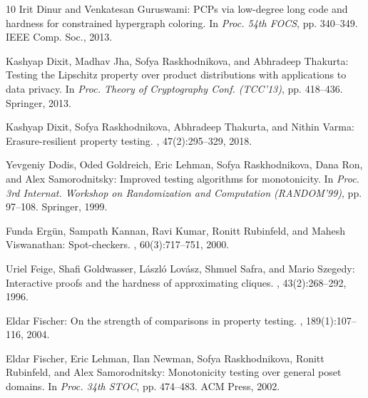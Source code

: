 \documentclass[11pt]{article}
\numberwithin{equation}{section}
\theoremstyle{definition}
\theoremstyle{plain}
\begin{document}
\begin{thebibliography}{10}
{\sc Irit Dinur and Venkatesan Guruswami}: {PCP}s via low-degree long code and
  hardness for constrained hypergraph coloring.
\newblock In {\em Proc. 54th FOCS}, pp. 340--349. IEEE Comp. Soc., 2013.

{\sc Kashyap Dixit, Madhav Jha, Sofya Raskhodnikova, and Abhradeep Thakurta}:
  Testing the {Lipschitz} property over product distributions with applications
  to data privacy.
\newblock In {\em Proc. Theory of Cryptography Conf. (TCC'13)}, pp. 418--436.
  Springer, 2013.
\newblock [\epfmtdoi{10.1007/978-3-642-36594-2\_24}]

{\sc Kashyap Dixit, Sofya Raskhodnikova, Abhradeep Thakurta, and Nithin Varma}:
  Erasure-resilient property testing.
, 47(2):295--329, 2018.
\newblock [\epfmtdoi{10.1137/16M1075661}]

{\sc Yevgeniy Dodis, Oded Goldreich, Eric Lehman, Sofya Raskhodnikova, Dana
  Ron, and Alex Samorodnitsky}: Improved testing algorithms for monotonicity.
\newblock In {\em Proc. 3rd Internat. Workshop on Randomization and Computation
  (RANDOM'99)}, pp. 97--108. Springer, 1999.
\newblock [\epfmtdoi{10.1007/978-3-540-48413-4\_10}]

{\sc Funda Erg{\"{u}}n, Sampath Kannan, Ravi Kumar, Ronitt Rubinfeld, and
  Mahesh Viswanathan}: Spot-checkers.
, 60(3):717--751, 2000.

{\sc Uriel Feige, Shafi Goldwasser, L{\'{a}}szl{\'{o}} Lov{\'{a}}sz, Shmuel
  Safra, and Mario Szegedy}: Interactive proofs and the hardness of
  approximating cliques.
, 43(2):268--292, 1996.
\newblock [\epfmtdoi{10.1145/226643.226652}]

{\sc Eldar Fischer}: On the strength of comparisons in property testing.
, 189(1):107--116, 2004.
\newblock [\epfmtdoi{10.1016/j.ic.2003.09.003}]

{\sc Eldar Fischer, Eric Lehman, Ilan Newman, Sofya Raskhodnikova, Ronitt
  Rubinfeld, and Alex Samorodnitsky}: Monotonicity testing over general poset
  domains.
\newblock In {\em Proc. 34th STOC}, pp. 474--483. ACM Press, 2002.
\newblock [\epfmtdoi{10.1145/509907.509977}]


\end{thebibliography}
\end{document}
